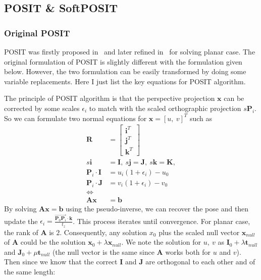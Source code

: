 \documentclass[a4paper]{article}
\begin{document}
\subsection{POSIT \& SoftPOSIT}
\subsubsection{Original POSIT}
POSIT was firstly proposed in~\cite{dementhon1995model} and later refined in~\cite{oberkampf1996iterative} for solving planar case. The original formulation of POSIT is slightly different with the formulation given below. However, the two formulation can be easily transformed by doing some variable replacements. Here I just list the key equations for POSIT algorithm.

The principle of POSIT algorithm is that the perspective projection $\mathbf{x}$ can be corrected by some scales $\epsilon_i$ to match with the scaled orthographic projection $s\mathbf{P}_i$. So we can formulate two normal equations for $\mathbf{x}=[u,\ v]^T$ such as
\begin{align*}
\mathbf{R} &= \left[
\begin{matrix}
\mathbf{i}^T \\ \mathbf{j}^T \\ \mathbf{k}^T
\end{matrix}
\right] \\
s\mathbf{i} &= \mathbf{I},\ s\mathbf{j} = \mathbf{J},\ s\mathbf{k} = \mathbf{K},\\
\mathbf{P}_i \cdot \mathbf{I} &=u_i(1+\epsilon_i)-u_0 \\
\mathbf{P}_i \cdot \mathbf{J} &=v_i(1+\epsilon_i)-v_0 \\
\Leftrightarrow & \\
\mathbf{A}\mathbf{x}&=\mathbf{b}
\end{align*}
By solving $\mathbf{A}\mathbf{x}=\mathbf{b}$ using the pseudo-inverse, we can recover the pose and then update the $\epsilon_i=\frac{\overrightarrow{\mathbf{P}_0\mathbf{P}_i} \cdot \mathbf{k}}{t_z}$. This process iterates until convergence. For planar case, the rank of $\mathbf{A}$ is $2$. Consequently, any solution $x_0$ plus the scaled null vector $\mathbf{x}_{null}$ of $\mathbf{A}$ could be the solution $\mathbf{x}_{0}+\lambda\mathbf{x}_{null}$. We note the solution for $u,\ v$ as $\mathbf{I}_0+\lambda \mathbf{t}_{null}$ and $\mathbf{J}_0+\mu\mathbf{t}_{null}$ (the null vector is the same since $\mathbf{A}$ works both for $u$ and $v$). Then since we know that the correct $\mathbf{I}$ and $\mathbf{J}$ are orthogonal to each other and of the same length:
\end{document}
